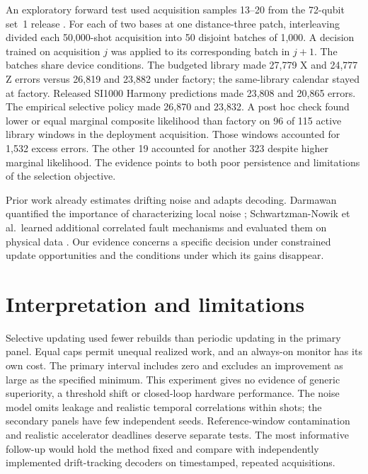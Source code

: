 \documentclass[10pt]{article}
\begin{document}
An exploratory forward test used acquisition samples 13--20 from the 72-qubit set~1 release \cite{google,hoyt}. For each of two bases at one distance-three patch, interleaving divided each 50,000-shot acquisition into 50 disjoint batches of 1,000. A decision trained on acquisition $j$ was applied to its corresponding batch in $j+1$. The batches share device conditions. The budgeted library made 27,779 X and 24,777 Z errors versus 26,819 and 23,882 under factory; the same-library calendar stayed at factory. Released SI1000 Harmony predictions made 23,808 and 20,865 errors. The empirical selective policy made 26,870 and 23,832. A post hoc check found lower or equal marginal composite likelihood than factory on 96 of 115 active library windows in the deployment acquisition. Those windows accounted for 1,532 excess errors. The other 19 accounted for another 323 despite higher marginal likelihood. The evidence points to both poor persistence and limitations of the selection objective.

Prior work already estimates drifting noise and adapts decoding. Darmawan quantified the importance of characterizing local noise \cite{darmawan}; Schwartzman-Nowik et al.\ learned additional correlated fault mechanisms and evaluated them on physical data \cite{augment}. Our evidence concerns a specific decision under constrained update opportunities and the conditions under which its gains disappear.

\section{Interpretation and limitations}
Selective updating used fewer rebuilds than periodic updating in the primary panel. Equal caps permit unequal realized work, and an always-on monitor has its own cost. The primary interval includes zero and excludes an improvement as large as the specified minimum. This experiment gives no evidence of generic superiority, a threshold shift or closed-loop hardware performance. The noise model omits leakage and realistic temporal correlations within shots; the secondary panels have few independent seeds. Reference-window contamination and realistic accelerator deadlines deserve separate tests. The most informative follow-up would hold the method fixed and compare with independently implemented drift-tracking decoders on timestamped, repeated acquisitions.
\end{document}
